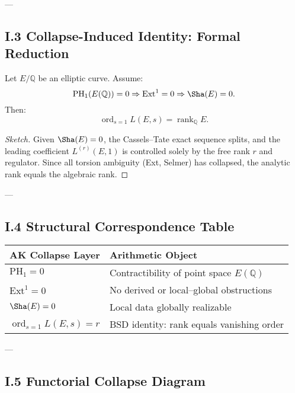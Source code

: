 ---

\subsection*{I.3 Collapse-Induced Identity: Formal Reduction}

\begin{theorem}
Let \( E/\mathbb{Q} \) be an elliptic curve.  
Assume:
\[
\mathrm{PH}_1(E(\mathbb{Q})) = 0 \Rightarrow \mathrm{Ext}^1 = 0 \Rightarrow \Sha(E) = 0.
\]
Then:
\[
\operatorname{ord}_{s=1} L(E,s) = \operatorname{rank}_{\mathbb{Q}} E.
\]
\end{theorem}

\begin{proof}[Sketch]
Given \( \Sha(E) = 0 \), the Cassels–Tate exact sequence splits, and the leading coefficient \( L^{(r)}(E,1) \) is controlled solely by the free rank \( r \) and regulator.  
Since all torsion ambiguity (Ext, Selmer) has collapsed, the analytic rank equals the algebraic rank.
\end{proof}

---

\subsection*{I.4 Structural Correspondence Table}

\begin{center}
\begin{tabular}{ll}
\toprule
\textbf{AK Collapse Layer} & \textbf{Arithmetic Object} \\
\midrule
\( \mathrm{PH}_1 = 0 \)         & Contractibility of point space \( E(\mathbb{Q}) \) \\
\( \mathrm{Ext}^1 = 0 \)        & No derived or local–global obstructions \\
\( \Sha(E) = 0 \)              & Local data globally realizable \\
\( \operatorname{ord}_{s=1} L(E,s) = r \) & BSD identity: rank equals vanishing order \\
\bottomrule
\end{tabular}
\end{center}

---

\subsection*{I.5 Functorial Collapse Diagram}

